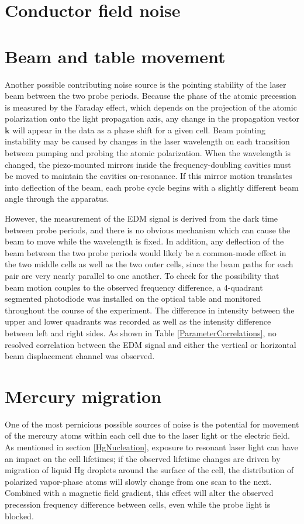 \documentclass [10pt, twoside] {uwthesis}[2012/04/02]
\begin{document}
\section{Conductor field noise} %

\section{Beam and table movement} %
Another possible contributing noise source is the pointing stability of the laser beam between the two probe periods. Because the phase of the atomic precession is measured by the Faraday effect, which depends on the projection of the atomic polarization onto the light propagation axis, any change in the propagation vector $\mathbf{k}$ will appear in the data as a phase shift for a given cell. Beam pointing instability may be caused by changes in the laser wavelength on each transition between pumping and probing the atomic polarization. When the wavelength is changed, the piezo-mounted mirrors inside the frequency-doubling cavities must be moved to maintain the cavities on-resonance. If this mirror motion translates into deflection of the beam, each probe cycle begins with a slightly different beam angle through the apparatus.

However, the measurement of the EDM signal is derived from the dark time between probe periods, and there is no obvious mechanism which can cause the beam to move while the wavelength is fixed. In addition, any deflection of the beam between the two probe periods would likely be a common-mode effect in the two middle cells as well as the two outer cells, since the beam paths for each pair are very nearly parallel to one another. To check for the possibility that beam motion couples to the observed frequency difference, a 4-quadrant segmented photodiode was installed on the optical table and monitored throughout the course of the experiment. The difference in intensity between the upper and lower quadrants was recorded as well as the intensity difference between left and right sides. As shown in Table \ref{ParameterCorrelations}, no resolved correlation between the EDM signal and either the vertical or horizontal beam displacement channel was observed.  

\section{Mercury migration} %
One of the most pernicious possible sources of noise is the potential for movement of the mercury atoms within each cell due to the laser light or the electric field. As mentioned in section \ref{HgNucleation}, exposure to resonant laser light can have an impact on the cell lifetimes; if the observed lifetime changes are driven by migration of liquid Hg droplets around the surface of the cell, the distribution of polarized vapor-phase atoms will slowly change from one scan to the next. Combined with a magnetic field gradient, this effect will alter the observed precession frequency difference between cells, even while the probe light is blocked. 
\end{document}
